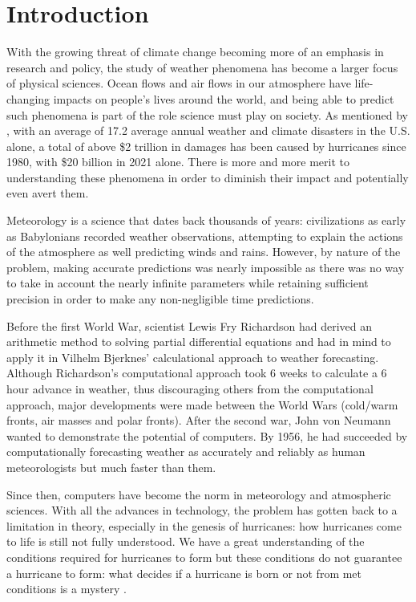 \chapter{Introduction}

With the growing threat of climate change becoming more of an emphasis in research and policy, the study of weather phenomena has become a larger focus of physical sciences. Ocean flows and air flows in our atmosphere have life-changing impacts on people's lives around the world, and being able to predict such phenomena is part of the role science must play on society. As mentioned by \cite{noaa}, with an average of 17.2 average annual weather and climate disasters in the U.S. alone, a total of above \$2 trillion in damages has been caused by hurricanes since 1980, with \$20 billion in 2021 alone. There is more and more merit to understanding these phenomena in order to diminish their impact and potentially even avert them.

Meteorology is a science that dates back thousands of years: civilizations as early as Babylonians recorded weather observations, attempting to explain the actions of the atmosphere as well predicting winds and rains. However, by nature of the problem, making accurate predictions was nearly impossible as there was no way to take in account the nearly infinite parameters while retaining sufficient precision in order to make any non-negligible time predictions. \cite{nebeker1995calculating}

Before the first World War, scientist Lewis Fry Richardson had derived an arithmetic method to solving partial differential equations and had in mind to apply it in Vilhelm Bjerknes' calculational approach to weather forecasting. Although Richardson's computational approach took 6 weeks to calculate a 6 hour advance in weather, thus discouraging others from the computational approach, major developments were made between the World Wars (cold/warm fronts, air masses and polar fronts). After the second war, John von Neumann wanted to demonstrate the potential of computers. By 1956, he had succeeded by computationally forecasting weather as accurately and reliably as human meteorologists but much faster than them. \cite{nebeker1995calculating}

Since then, computers have become the norm in meteorology and atmospheric sciences. With all the advances in technology, the problem has gotten back to a limitation in theory, especially in the genesis of hurricanes: how hurricanes come to life is still not fully understood. We have a great understanding of the conditions required for hurricanes to form but these conditions do not guarantee a hurricane to form: what decides if a hurricane is born or not from met conditions is a mystery \cite{develop}.

